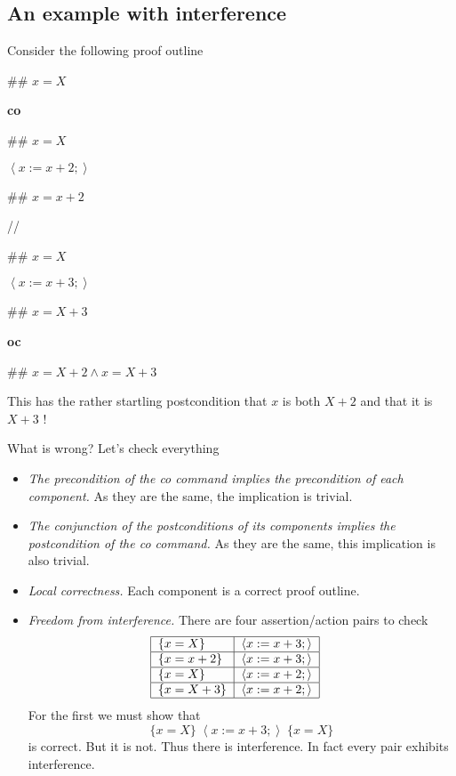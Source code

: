 \documentclass[muchmore,11pt]{article}%
\begin{document}
\subsection{An example with interference}

Consider the following proof outline

\begin{code}
\#\# $x=X$

\textbf{co}

\begin{indent}
\item \#\# $x=X$

\item $\left\langle x:=x+2;\right\rangle $

\item \#\# $x=x+2$
\end{indent}

//

\begin{indent}
\item \#\# $x=X$

\item $\left\langle x:=x+3;\right\rangle $

\item \#\# $x=X+3$
\end{indent}

\textbf{oc}

\#\# $x=X+2\wedge x=X+3$
\end{code}

This has the rather startling postcondition that $x$ is both $X+2$ and that it
is $X+3$ !

What is wrong? Let's check everything

\begin{itemize}
\item \emph{The precondition of the co command implies the precondition of
each component.} As they are the same, the implication is trivial.

\item \emph{The conjunction of the postconditions of its components implies
the postcondition of the co command.} As they are the same, this implication
is also trivial.

\item \emph{Local correctness.} Each component is a correct proof outline.

\item \emph{Freedom from interference.} There are four assertion/action pairs
to check%
\[%
\begin{tabular}
[c]{|l|l|}\hline
$\{x=X\}$ & $\left\langle x:=x+3;\right\rangle $\\\hline
$\{x=x+2\}$ & $\left\langle x:=x+3;\right\rangle $\\\hline
$\{x=X\}$ & $\left\langle x:=x+2;\right\rangle $\\\hline
$\{x=X+3\}$ & $\left\langle x:=x+2;\right\rangle $\\\hline
\end{tabular}
\ \ \
\]
For the first we must show that%
\[
\{x=X\}\;\left\langle x:=x+3;\right\rangle \;\{x=X\}
\]
is correct. But it is not. Thus there is interference. In fact every pair
exhibits interference.
\end{itemize}
\end{document}
